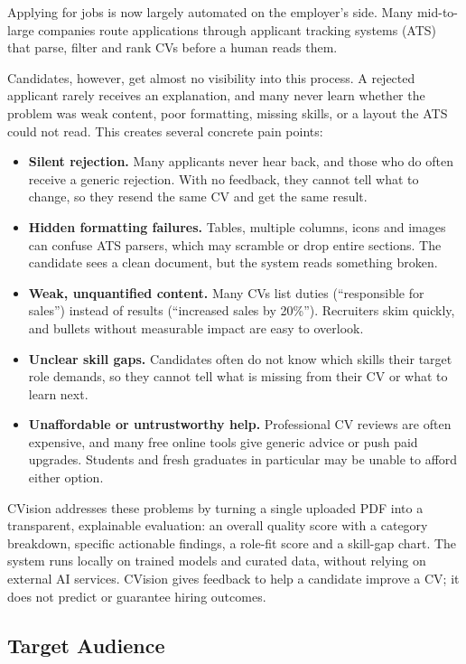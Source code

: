 \documentclass[11pt,a4paper]{article}
\begin{document}
Applying for jobs is now largely automated on the employer's side. Many
mid-to-large companies route applications through applicant tracking
systems (ATS) that parse, filter and rank CVs before a human reads them.

Candidates, however, get almost no visibility into this process. A
rejected applicant rarely receives an explanation, and many never learn
whether the problem was weak content, poor formatting, missing skills,
or a layout the ATS could not read. This creates several concrete pain
points:

\begin{itemize}
  \item \textbf{Silent rejection.} Many applicants never hear back, and
  those who do often receive a generic rejection. With no feedback,
  they cannot tell what to change, so they resend the same CV and get
  the same result.
  \item \textbf{Hidden formatting failures.} Tables, multiple columns,
  icons and images can confuse ATS parsers, which may scramble or drop
  entire sections. The candidate sees a clean document, but the system
  reads something broken.
  \item \textbf{Weak, unquantified content.} Many CVs list duties
  (``responsible for sales'') instead of results (``increased sales by
  20\%''). Recruiters skim quickly, and bullets without measurable
  impact are easy to overlook.
  \item \textbf{Unclear skill gaps.} Candidates often do not know which
  skills their target role demands, so they cannot tell what is missing
  from their CV or what to learn next.
  \item \textbf{Unaffordable or untrustworthy help.} Professional CV
  reviews are often expensive, and many free online tools give generic
  advice or push paid upgrades. Students and fresh graduates in
  particular may be unable to afford either option.
\end{itemize}

CVision addresses these problems by turning a single uploaded PDF into
a transparent, explainable evaluation: an overall quality score with a
category breakdown, specific actionable findings, a role-fit score and a
skill-gap chart. The system runs locally on trained models and curated
data, without relying on external AI services. CVision gives feedback to
help a candidate improve a CV; it does not predict or guarantee hiring
outcomes.

\subsection{Target Audience}
\end{document}

